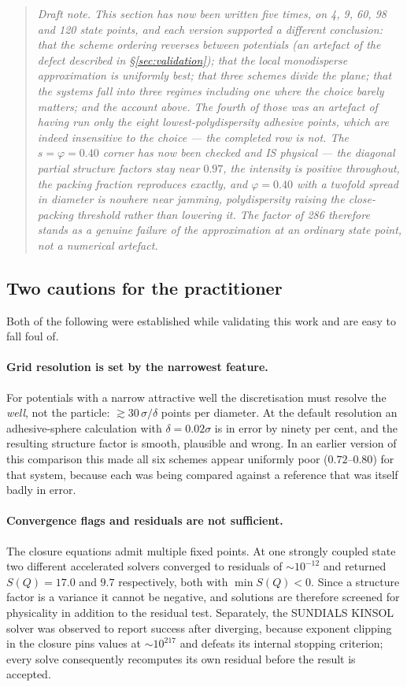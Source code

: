 \begin{quote}\small\itshape
Draft note. This section has now been written five times, on 4, 9, 60, 98 and
120 state points, and each version supported a different conclusion: that the
scheme ordering reverses between potentials (an artefact of the defect
described in \S\ref{sec:validation}); that the local monodisperse
approximation is uniformly best; that three schemes divide the plane; that the
systems fall into three regimes including one where the choice barely matters;
and the account above. The fourth of those was an artefact of having run only
the eight lowest-polydispersity adhesive points, which are indeed insensitive
to the choice --- the completed row is not. The $s = \varphi = 0.40$ corner
has now been checked and IS physical --- the diagonal partial structure
factors stay near $0.97$, the intensity is positive throughout, the packing
fraction reproduces exactly, and $\varphi = 0.40$ with a twofold spread in
diameter is nowhere near jamming, polydispersity raising the close-packing
threshold rather than lowering it. The factor of 286 therefore stands as a
genuine failure of the approximation at an ordinary state point, not a
numerical artefact.
\end{quote}

\subsection{Two cautions for the practitioner}

Both of the following were established while validating this work and are easy
to fall foul of.

\paragraph{Grid resolution is set by the narrowest feature.}
For potentials with a narrow attractive well the discretisation must resolve
the \emph{well}, not the particle: $\gtrsim 30\,\sigma/\delta$ points per
diameter. At the default resolution an adhesive-sphere calculation with
$\delta = 0.02\sigma$ is in error by ninety per cent, and the resulting
structure factor is smooth, plausible and wrong. In an earlier version of this
comparison this made all six schemes appear uniformly poor ($0.72$--$0.80$)
for that system, because each was being compared against a reference that was
itself badly in error.

\paragraph{Convergence flags and residuals are not sufficient.}
The closure equations admit multiple fixed points. At one strongly coupled
state two different accelerated solvers converged to residuals of
$\sim10^{-12}$ and returned $S(Q)=17.0$ and $9.7$ respectively, both with
$\min S(Q) < 0$. Since a structure factor is a variance it cannot be negative,
and solutions are therefore screened for physicality in addition to the
residual test. Separately, the SUNDIALS KINSOL solver was observed to report
success after diverging, because exponent clipping in the closure pins values
at $\sim10^{217}$ and defeats its internal stopping criterion; every solve
consequently recomputes its own residual before the result is accepted.

